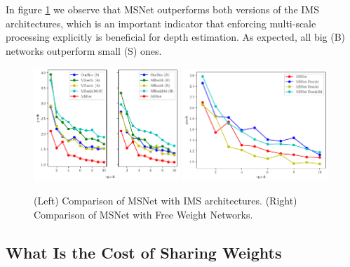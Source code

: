 \documentclass[runningheads]{llncs}
\begin{document}
In figure \ref{fig:mae_SFNvsGenericNets} we observe that MSNet outperforms both versions of the IMS architectures, which is an important indicator that enforcing multi-scale processing explicitly is beneficial for depth estimation. As expected, all big (B) networks outperform small (S) ones.

\begin{figure}[!htbp]
    \centering
    \includegraphics[width=0.49\textwidth]{figures/freiburg_msnet_vs_monolithic_mae.pdf}
    \includegraphics[width=0.49\textwidth]{figures/freiburg_msnet_vs_free_weights_mae.pdf}
    \caption{(Left) Comparison of MSNet with IMS architectures. (Right) Comparison of MSNet with Free Weight Networks.}
    \label{fig:mae_SFNvsGenericNets}
\end{figure}

\subsection{What Is the Cost of Sharing Weights}
\end{document}
